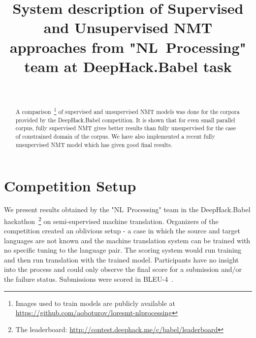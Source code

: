 \documentclass[]{article}
\begin{document}
\begin{acronym}
\end{acronym}

\title{\bf System description of Supervised and Unsupervised  \acl{NMT} approaches from {"NL~Processing"} team at DeepHack.Babel task}
\author{ \hfill  {}\\
\AND
         \hfill {}
}

\maketitle
\pagestyle{empty}

\begin{abstract}
  A comparison~\footnote{Images used to train models are publicly available at \url{https://github.com/aoboturov/loresmt-nlprocessing}} of supervised and unsupervised \ac{NMT} models was done for the corpora provided by the DeepHack.Babel competition.
  It is shown that for even small parallel corpus, fully supervised \ac{NMT} gives better results than fully unsupervised for the case of constrained domain of the corpus.
  We have also implemented a recent fully unsupervised \ac{NMT} model which has given good final results.
\end{abstract}

\section{Competition Setup}
\label{sect:setup}

We present results obtained by the "NL~Processing" team in the DeepHack.Babel hackathon~\footnote{The leaderboard: \url{http://contest.deephack.me/c/babel/leaderboard}} on semi-supervised machine translation.
Organizers of the competition created an oblivious setup - a case in which the source and target languages are not known and the machine translation system can be trained with no specific tuning to the language pair.
The scoring system would run training and then run translation with the trained model.
Participants have no insight into the process and could only observe the final score for a submission and/or the failure status.
Submissions were scored in BLEU-4~\citep{papineni2002bleu}.
\end{document}
